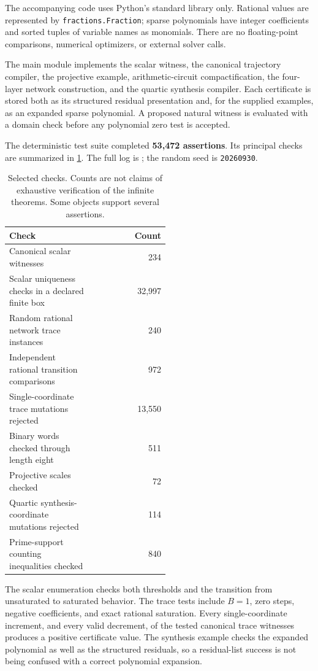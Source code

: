 \documentclass[11pt,letterpaper]{article}
\numberwithin{equation}{section}
\theoremstyle{definition}
\theoremstyle{remark}
\newcommand{\pathtext}[1]{\texttt{\small\detokenize{#1}}}
\begin{document}
The accompanying code uses Python's standard library only. Rational values
are represented by \texttt{fractions.Fraction}; sparse polynomials have
integer coefficients and sorted tuples of variable names as monomials.
There are no floating-point comparisons, numerical optimizers, or external
solver calls.

The main module implements the scalar witness, the canonical trajectory
compiler, the projective example, arithmetic-circuit compactification, the
four-layer network construction, and the quartic synthesis compiler. Each
certificate is stored both as its structured residual presentation and,
for the supplied examples, as an expanded sparse polynomial. A proposed
natural witness is evaluated with a domain check before any polynomial
zero test is accepted.

The deterministic test suite completed \textbf{53,472 assertions}. Its
principal checks are summarized in \cref{pqc:pm:tab:tests}. The full log is
\pathtext{verification_report.txt}; the random seed is \texttt{20260930}.

\begin{table}[ht]
\centering\small
\begin{tabular}{p{0.52\linewidth}r}
\toprule
Check & Count\\
\midrule
Canonical scalar witnesses & 234\\
Scalar uniqueness checks in a declared finite box & 32,997\\
Random rational network trace instances & 240\\
Independent rational transition comparisons & 972\\
Single-coordinate trace mutations rejected & 13,550\\
Binary words checked through length eight & 511\\
Projective scales checked & 72\\
Quartic synthesis-coordinate mutations rejected & 114\\
Prime-support counting inequalities checked & 840\\
\bottomrule
\end{tabular}
\caption{Selected checks. Counts are not claims of exhaustive verification of
the infinite theorems. Some objects support several assertions.}
\label{pqc:pm:tab:tests}
\end{table}

The scalar enumeration checks both thresholds and the transition from
unsaturated to saturated behavior. The trace tests include $B=1$, zero
steps, negative coefficients, and exact rational saturation. Every
single-coordinate increment, and every valid decrement, of the tested
canonical trace witnesses produces a positive certificate value. The
synthesis example checks the expanded polynomial as well as the structured
residuals, so a residual-list success is not being confused with a correct
polynomial expansion.
\end{document}
